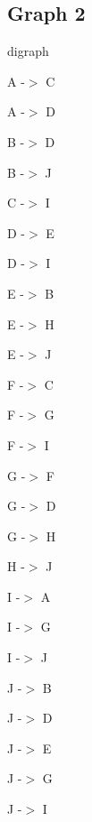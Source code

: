 \documentclass{article}
\begin{document}
\subsection{Graph 2}
digraph {

A -$>$ C

A -$>$ D

B -$>$ D

B -$>$ J

C -$>$ I

D -$>$ E

D -$>$ I

E -$>$ B 

E -$>$ H

E -$>$ J

F -$>$ C

F -$>$ G

F -$>$ I

G -$>$ F

G -$>$ D

G -$>$ H

H -$>$ J

I -$>$ A

I -$>$ G

I -$>$ J

J -$>$ B

J -$>$ D

J -$>$ E

J -$>$ G

J -$>$ I

}
\end{document}
